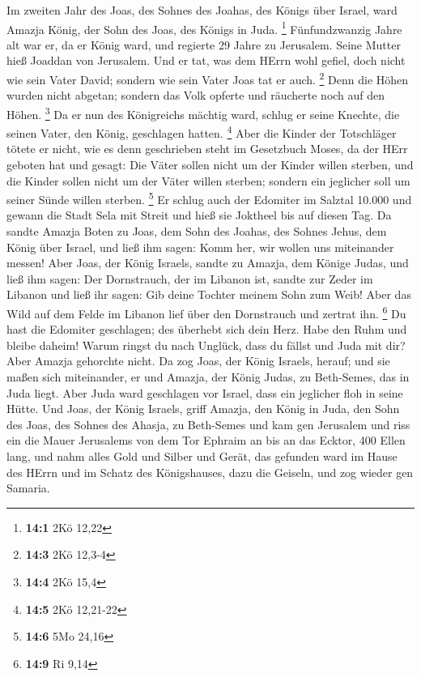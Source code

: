  Im zweiten Jahr des Joas, des Sohnes des Joahas, des Königs
über Israel, ward Amazja König, der Sohn des Joas, des Königs in Juda.
\footnote{\textbf{14:1} 2Kö 12,22}  Fünfundzwanzig Jahre alt
war er, da er König ward, und regierte 29 Jahre zu Jerusalem. Seine
Mutter hieß Joaddan von Jerusalem.  Und er tat, was dem
HErrn wohl gefiel, doch nicht wie sein Vater David; sondern wie sein
Vater Joas tat er auch. \footnote{\textbf{14:3} 2Kö 12,3-4} 
Denn die Höhen wurden nicht abgetan; sondern das Volk opferte und
räucherte noch auf den Höhen. \footnote{\textbf{14:4} 2Kö 15,4}
 Da er nun des Königreichs mächtig ward, schlug er seine
Knechte, die seinen Vater, den König, geschlagen hatten. \footnote{\textbf{14:5}
  2Kö 12,21-22}  Aber die Kinder der Totschläger tötete er
nicht, wie es denn geschrieben steht im Gesetzbuch Moses, da der HErr
geboten hat und gesagt: Die Väter sollen nicht um der Kinder willen
sterben, und die Kinder sollen nicht um der Väter willen sterben;
sondern ein jeglicher soll um seiner Sünde willen sterben. \footnote{\textbf{14:6}
  5Mo 24,16}  Er schlug auch der Edomiter im Salztal 10.000
und gewann die Stadt Sela mit Streit und hieß sie Joktheel bis auf
diesen Tag.  Da sandte Amazja Boten zu Joas, dem Sohn des
Joahas, des Sohnes Jehus, dem König über Israel, und ließ ihm sagen:
Komm her, wir wollen uns miteinander messen!  Aber Joas, der
König Israels, sandte zu Amazja, dem Könige Judas, und ließ ihm sagen:
Der Dornstrauch, der im Libanon ist, sandte zur Zeder im Libanon und
ließ ihr sagen: Gib deine Tochter meinem Sohn zum Weib! Aber das Wild
auf dem Felde im Libanon lief über den Dornstrauch und zertrat ihn.
\footnote{\textbf{14:9} Ri 9,14}  Du hast die Edomiter
geschlagen; des überhebt sich dein Herz. Habe den Ruhm und bleibe
daheim! Warum ringst du nach Unglück, dass du fällst und Juda mit dir?
 Aber Amazja gehorchte nicht. Da zog Joas, der König
Israels, herauf; und sie maßen sich miteinander, er und Amazja, der
König Judas, zu Beth-Semes, das in Juda liegt.  Aber Juda
ward geschlagen vor Israel, dass ein jeglicher floh in seine Hütte.
 Und Joas, der König Israels, griff Amazja, den König in
Juda, den Sohn des Joas, des Sohnes des Ahasja, zu Beth-Semes und kam
gen Jerusalem und riss ein die Mauer Jerusalems von dem Tor Ephraim an
bis an das Ecktor, 400 Ellen lang,  und nahm alles Gold und
Silber und Gerät, das gefunden ward im Hause des HErrn und im Schatz des
Königshauses, dazu die Geiseln, und zog wieder gen Samaria.
